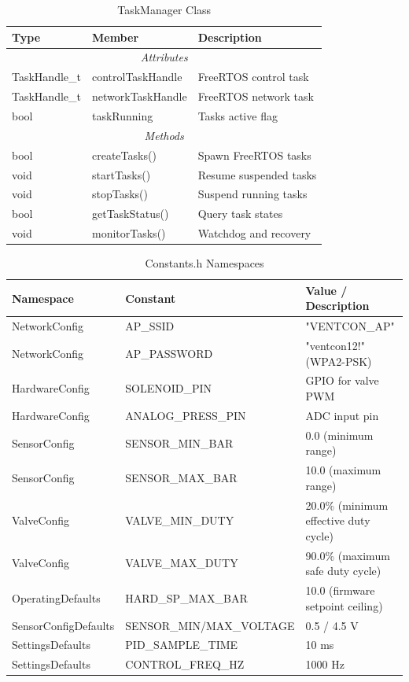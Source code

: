\begin{table}[H]
\centering
\caption{TaskManager Class}
\label{tab:task-manager}
\begin{tabular}{|l|l|p{6cm}|}
\hline
\textbf{Type} & \textbf{Member} & \textbf{Description} \\
\hline
\multicolumn{3}{|c|}{\textit{Attributes}} \\
\hline
TaskHandle\_t & controlTaskHandle & FreeRTOS control task \\
TaskHandle\_t & networkTaskHandle & FreeRTOS network task \\
bool & taskRunning & Tasks active flag \\
\hline
\multicolumn{3}{|c|}{\textit{Methods}} \\
\hline
bool & createTasks() & Spawn FreeRTOS tasks \\
void & startTasks() & Resume suspended tasks \\
void & stopTasks() & Suspend running tasks \\
bool & getTaskStatus() & Query task states \\
void & monitorTasks() & Watchdog and recovery \\
\hline
\end{tabular}
\end{table}

\begin{table}[H]
\centering
\caption{Constants.h Namespaces}
\label{tab:constants}
\begin{tabular}{|l|l|p{6cm}|}
\hline
\textbf{Namespace} & \textbf{Constant} & \textbf{Value / Description} \\
\hline
NetworkConfig & AP\_SSID & "VENTCON\_AP" \\
NetworkConfig & AP\_PASSWORD & "ventcon12!" (WPA2-PSK) \\
HardwareConfig & SOLENOID\_PIN & GPIO for valve PWM \\
HardwareConfig & ANALOG\_PRESS\_PIN & ADC input pin \\
SensorConfig & SENSOR\_MIN\_BAR & 0.0 (minimum range) \\
SensorConfig & SENSOR\_MAX\_BAR & 10.0 (maximum range) \\
ValveConfig & VALVE\_MIN\_DUTY & 20.0\% (minimum effective duty cycle) \\
ValveConfig & VALVE\_MAX\_DUTY & 90.0\% (maximum safe duty cycle) \\
OperatingDefaults & HARD\_SP\_MAX\_BAR & 10.0 (firmware setpoint ceiling) \\
SensorConfigDefaults & SENSOR\_MIN/MAX\_VOLTAGE & 0.5 / 4.5 V \\
SettingsDefaults & PID\_SAMPLE\_TIME & 10 ms \\
SettingsDefaults & CONTROL\_FREQ\_HZ & 1000 Hz \\
\hline
\end{tabular}
\end{table}

